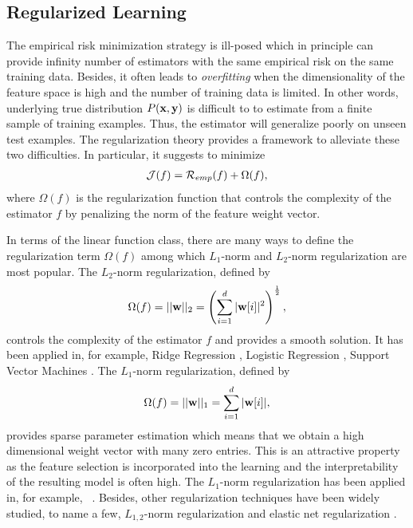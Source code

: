 \subsection{Regularized Learning}\label{sc_rl}

The empirical risk minimization strategy is ill-posed which in principle can provide infinity number of estimators with the same empirical risk on the same training data.
Besides, it often leads to \textit{overfitting} when the dimensionality of the feature space is high and the number of training data is limited.
In other words, underlying true distribution $P(\mathbf {x},\mathbf {y})$ is difficult to to estimate from a finite sample of training examples.
Thus, the estimator will generalize poorly on unseen test examples.
The {regularization theory} \citep{Evgeniou02regularization} provides a framework to alleviate these two difficulties.
In particular, it suggests to minimize 
 \begin{align*}
	\mathcal{J}(f) = \mathcal{R}_{emp}(f) + \Omega(f),
\end{align*}
where $\Omega(f)$ is the regularization function that controls the complexity of the estimator $f$ by penalizing the norm of the feature weight vector.

In terms of the linear function class, there are many ways to define the regularization term $\Omega(f)$ among which $L_1$-norm and $L_2$-norm regularization are most popular.
The $L_2$-norm regularization, defined by 
\begin{align*}
	\Omega(f) = ||\mathbf {w}||_2=\left(\sum_{i=1}^d|\mathbf {w}[i]|^2\right)^{\frac{1}{2}},
\end{align*} 
controls the complexity of the estimator $f$ and provides a smooth solution.
It has been applied in, for example, Ridge Regression \citep{Hoerl00ridge}, Logistic Regression \citep{Chen00}, Support Vector Machines \citep{Cortes95support}.
The $L_1$-norm regularization, defined by
\begin{align*}
	\Omega(f) = ||\mathbf {w}||_1=\sum_{i=1}^d|\mathbf {w}[i]|,
\end{align*}
provides sparse parameter estimation which means that we obtain a high dimensional weight vector with many zero entries.
This is an attractive property as the feature selection is incorporated into the learning and the interpretability of the resulting model is often high.
The $L_1$-norm regularization has been applied in, for example, \lasso\ \citep{Tibshirani94regression}.
Besides, other regularization techniques have been widely studied, to name a few, $L_{1,2}$-norm regularization \citep{Argyriou07multitask} and elastic net regularization \citep{Zou05regularizationa}.


